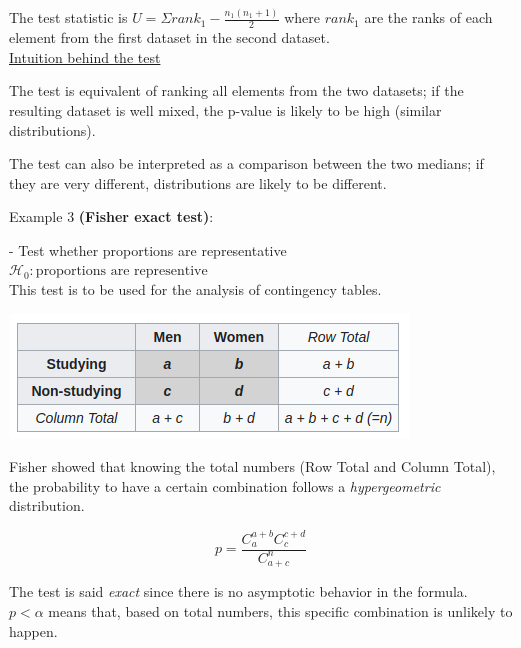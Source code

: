\vspace{5mm}

The test statistic is $U = \Sigma rank_1 - \frac{n_1(n_1+1)}{2}$ where $rank_1$ are the ranks of each element from the first dataset in the second dataset. \\

\underline{Intuition behind the test}

The test is equivalent of ranking all elements from the two datasets; if the resulting dataset is well mixed, the p-value is likely to be high (similar distributions).

The test can also be interpreted as a comparison between the two medians; if they are very different, distributions are likely to be different.

\vspace{5mm}

Example 3 \textbf{(Fisher exact test)}: 

\vspace{5mm}

- Test whether proportions are representative \\

$\mathcal{H}_0: \text{proportions are representive} $ \\

This test is to be used for the analysis of contingency tables.

\begin{center}
\includegraphics[scale=0.6]{fisher_contingency_table.png}
\end{center}

Fisher showed that knowing the total numbers (Row Total and Column Total), the probability to have a certain combination follows a \textit{hypergeometric} distribution.

$$p = \frac{C_a^{a+b} C_c^{c+d}}{C_{a+c}^n}$$

The test is said \textit{exact} since there is no asymptotic behavior in the formula. \\

$p < \alpha$ means that, based on total numbers, this specific combination is unlikely to happen.

\vspace{5mm}